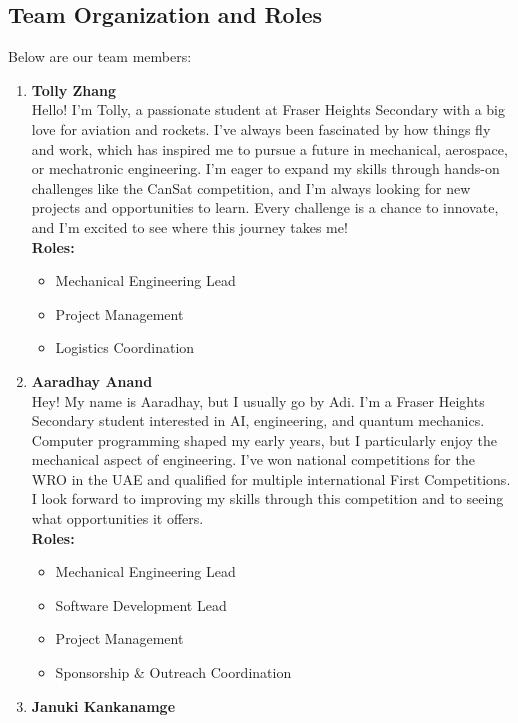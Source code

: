 \documentclass{article}
\begin{document}
\subsection{Team Organization and Roles}
Below are our team members: \\[1ex]
\begin{enumerate}
    \item \textbf{Tolly Zhang}\\
    Hello! I’m Tolly, a passionate student at Fraser Heights Secondary with a big love for aviation and rockets. I’ve always been fascinated by how things fly and work, which has inspired me to pursue a future in mechanical, aerospace, or mechatronic engineering. I’m eager to expand my skills through hands-on challenges like the CanSat competition, and I’m always looking for new projects and opportunities to learn. Every challenge is a chance to innovate, and I’m excited to see where this journey takes me!\\[1ex]
    \textbf{Roles:} 
    \begin{itemize}
        \item Mechanical Engineering Lead
        \item Project Management
        \item Logistics Coordination
    \end{itemize}
    \item \textbf{Aaradhay Anand}\\
    Hey! My name is Aaradhay, but I usually go by Adi. I’m a Fraser Heights Secondary student interested in AI, engineering, and quantum mechanics. Computer programming shaped my early years, but I particularly enjoy the mechanical aspect of engineering. I’ve won national competitions for the WRO in the UAE and qualified for multiple international First Competitions. I look forward to improving my skills through this competition and to seeing what opportunities it offers.\\[1ex]
    \textbf{Roles:}
    \begin{itemize}
        \item Mechanical Engineering Lead
        \item Software Development Lead
        \item Project Management
        \item Sponsorship \& Outreach Coordination
    \end{itemize}
    \item \textbf{Januki Kankanamge}\\

\end{enumerate}
\end{document}
